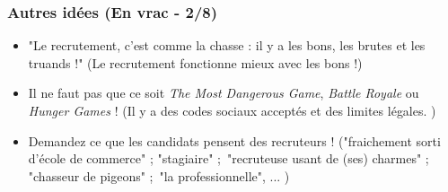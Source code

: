 \documentclass[slidetop,11pt]{beamer}
\begin{document}
\begin{frame}
\end{frame}

\begin{frame}
	\frametitle{Autres id{\'e}es (En vrac - 2/8)}
	\begin{itemize}
		\item "Le recrutement, c'est comme la chasse : il y a les bons, les brutes et les truands !" (Le recrutement fonctionne mieux avec les bons !)
		\item Il ne faut pas que ce soit \emph{The Most Dangerous Game}, \emph{Battle Royale} ou \emph{Hunger Games} ! (Il y a des codes sociaux accept{\'e}s et des limites l{\'e}gales. )
		\item Demandez ce que les candidats pensent des recruteurs ! ("fraichement sorti d'{\'e}cole de commerce" ; "stagiaire" ;~\newline "recruteuse usant de (ses) charmes" ; "chasseur de pigeons" ;~\newline "la professionnelle", ... )
	\end{itemize}
\end{frame}
\end{document}
